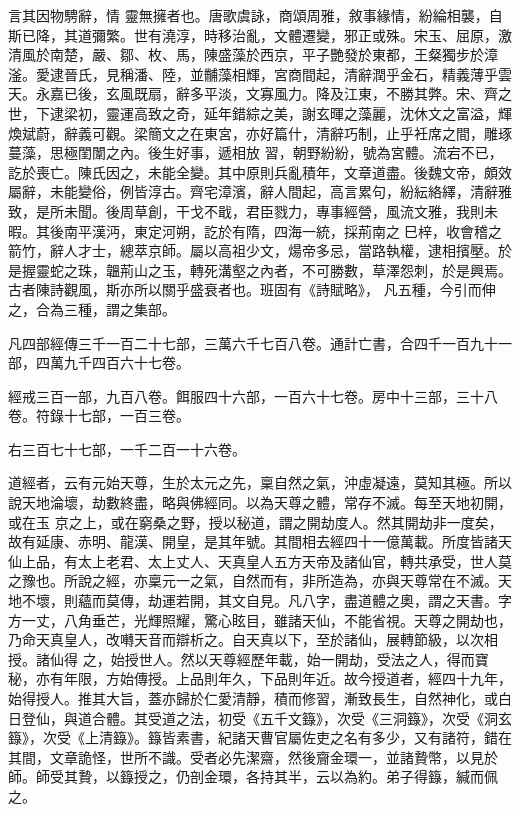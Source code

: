 \begin{pinyinscope}
 言其因物騁辭，情
 靈無擁者也。唐歌虞詠，商頌周雅，敘事緣情，紛綸相襲，自斯已降，其道彌繁。世有澆淳，時移治亂，文體遷變，邪正或殊。宋玉、屈原，激清風於南楚，嚴、鄒、枚、馬，陳盛藻於西京，平子艷發於東都，王粲獨步於漳滏。愛逮晉氏，見稱潘、陸，並黼藻相輝，宮商間起，清辭潤乎金石，精義薄乎雲天。永嘉已後，玄風既扇，辭多平淡，文寡風力。降及江東，不勝其弊。宋、齊之世，下逮梁初，靈運高致之奇，延年錯綜之美，謝玄暉之藻麗，沈休文之富溢，輝煥斌蔚，辭義可觀。梁簡文之在東宮，亦好篇什，清辭巧制，止乎衽席之間，雕琢蔓藻，思極閨闈之內。後生好事，遞相放
 習，朝野紛紛，號為宮體。流宕不已，訖於喪亡。陳氏因之，未能全變。其中原則兵亂積年，文章道盡。後魏文帝，頗效屬辭，未能變俗，例皆淳古。齊宅漳濱，辭人間起，高言累句，紛紜絡繹，清辭雅致，是所未聞。後周草創，干戈不戢，君臣戮力，專事經營，風流文雅，我則未暇。其後南平漢沔，東定河朔，訖於有隋，四海一統，採荊南之巳梓，收會稽之箭竹，辭人才士，總萃京師。屬以高祖少文，煬帝多忌，當路執權，逮相擯壓。於是握靈蛇之珠，韞荊山之玉，轉死溝壑之內者，不可勝數，草澤怨刺，於是興焉。古者陳詩觀風，斯亦所以關乎盛衰者也。班固有《詩賦略》，
 凡五種，今引而伸之，合為三種，謂之集部。



 凡四部經傳三千一百二十七部，三萬六千七百八卷。通計亡書，合四千一百九十一部，四萬九千四百六十七卷。



 經戒三百一部，九百八卷。餌服四十六部，一百六十七卷。房中十三部，三十八卷。符錄十七部，一百三卷。



 右三百七十七部，一千二百一十六卷。



 道經者，云有元始天尊，生於太元之先，稟自然之氣，沖虛凝遠，莫知其極。所以說天地淪壞，劫數終盡，略與佛經同。以為天尊之體，常存不滅。每至天地初開，或在玉
 京之上，或在窮桑之野，授以秘道，謂之開劫度人。然其開劫非一度矣，故有延康、赤明、龍漢、開皇，是其年號。其間相去經四十一億萬載。所度皆諸天仙上品，有太上老君、太上丈人、天真皇人五方天帝及諸仙官，轉共承受，世人莫之豫也。所說之經，亦稟元一之氣，自然而有，非所造為，亦與天尊常在不滅。天地不壞，則蘊而莫傳，劫運若開，其文自見。凡八字，盡道體之奧，謂之天書。字方一丈，八角垂芒，光輝照耀，驚心眩目，雖諸天仙，不能省視。天尊之開劫也，乃命天真皇人，改囀天音而辯析之。自天真以下，至於諸仙，展轉節級，以次相授。諸仙得
 之，始授世人。然以天尊經歷年載，始一開劫，受法之人，得而寶秘，亦有年限，方始傳授。上品則年久，下品則年近。故今授道者，經四十九年，始得授人。推其大旨，蓋亦歸於仁愛清靜，積而修習，漸致長生，自然神化，或白日登仙，與道合體。其受道之法，初受《五千文籙》，次受《三洞籙》，次受《洞玄籙》，次受《上清籙》。籙皆素書，紀諸天曹官屬佐吏之名有多少，又有諸符，錯在其間，文章詭怪，世所不識。受者必先潔齋，然後齎金環一，並諸贄幣，以見於師。師受其贄，以籙授之，仍剖金環，各持其半，云以為約。弟子得籙，緘而佩之。




\end{pinyinscope}
